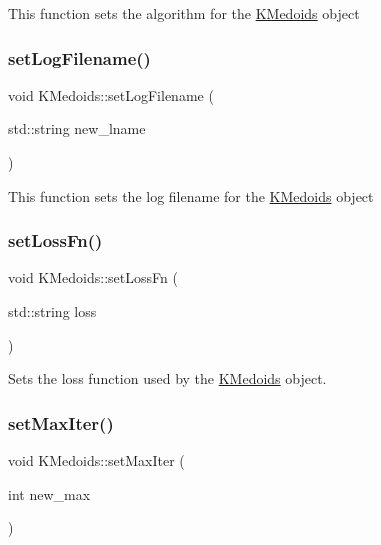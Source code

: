 This function sets the algorithm for the \hyperlink{classKMedoids}{K\+Medoids} object \mbox{\label{classKMedoids_a45f89770245bff638e25bcd39ab52013}} 
\subsubsection{\texorpdfstring{set\+Log\+Filename()}{setLogFilename()}}
{\footnotesize\ttfamily void K\+Medoids\+::set\+Log\+Filename (\begin{DoxyParamCaption}\item[{std\+::string}]{new\+\_\+lname }\end{DoxyParamCaption})}

This function sets the log filename for the \hyperlink{classKMedoids}{K\+Medoids} object \mbox{\label{classKMedoids_ab442bf7198be7a48a7eb5901ac7ca571}} 
\subsubsection{\texorpdfstring{set\+Loss\+Fn()}{setLossFn()}}
{\footnotesize\ttfamily void K\+Medoids\+::set\+Loss\+Fn (\begin{DoxyParamCaption}\item[{std\+::string}]{loss }\end{DoxyParamCaption})}

Sets the loss function used by the \hyperlink{classKMedoids}{K\+Medoids} object. \mbox{\label{classKMedoids_ae1a84d5509090d31cd1c04616fd615f3}} 
\subsubsection{\texorpdfstring{set\+Max\+Iter()}{setMaxIter()}}
{\footnotesize\ttfamily void K\+Medoids\+::set\+Max\+Iter (\begin{DoxyParamCaption}\item[{int}]{new\+\_\+max }\end{DoxyParamCaption})}

